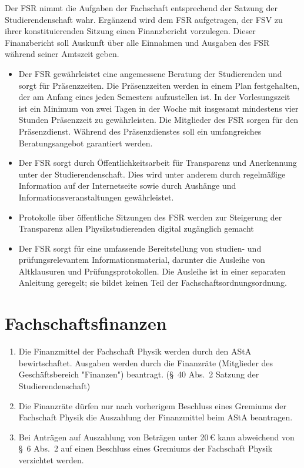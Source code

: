 \documentclass[
	a4paper,
	12pt,
	oneside,
	parskip=half-,
	pagesize,
	headsepline,
	german,
	ngerman
]{scrartcl}
\begin{document}
Der FSR nimmt die Aufgaben der Fachschaft entsprechend der Satzung der Studierendenschaft wahr. Ergänzend wird dem FSR aufgetragen, der FSV zu ihrer konstituierenden Sitzung einen Finanzbericht vorzulegen. Dieser Finanzbericht soll Auskunft über alle Einnahmen und Ausgaben des FSR während seiner Amtszeit geben.

\begin{itemize}
	\item Der FSR gewährleistet eine angemessene Beratung der Studierenden und sorgt für Präsenzzeiten. Die Präsenzzeiten werden in einem Plan festgehalten, der am Anfang eines jeden Semesters aufzustellen ist. In der Vorlesungszeit ist ein Minimum von zwei Tagen in der Woche mit insgesamt mindestens vier Stunden Präsenzzeit zu gewährleisten. Die Mitglieder des FSR sorgen für den Präsenzdienst. Während des Präsenzdienstes soll ein umfangreiches Beratungsangebot garantiert werden.
	\item Der FSR sorgt durch Öffentlichkeitsarbeit für Transparenz und Anerkennung unter der Studierendenschaft. Dies wird unter anderem durch regelmäßige Information auf der Internetseite sowie durch Aushänge und Informationsveranstaltungen gewährleistet.
	\item Protokolle über öffentliche Sitzungen des FSR werden zur Steigerung der Transparenz allen Physikstudierenden digital zugänglich gemacht
	\item Der FSR sorgt für eine umfassende Bereitstellung von studien- und prüfungsrelevantem Informationsmaterial, darunter die Ausleihe von Altklausuren und Prüfungsprotokollen. Die Ausleihe ist in einer separaten Anleitung geregelt; sie bildet keinen Teil der Fachschaftsordnungsordnung.
\end{itemize}


\section{Fachschaftsfinanzen}
\label{sec:Finanzen}

\begin{enumerate}
	\item Die Finanzmittel der Fachschaft Physik werden durch den AStA bewirtschaftet. Ausgaben werden durch die Finanzräte (Mitglieder des Geschäftsbereich "Finanzen") beantragt. (§~40 Abs.~2 Satzung der Studierendenschaft)
	\item Die Finanzräte dürfen nur nach vorherigem Beschluss eines Gremiums der Fachschaft Physik die Auszahlung der Finanzmittel beim AStA beantragen.
	\label{Finanzen_2}
	\item Bei Anträgen auf Auszahlung von Beträgen unter 20\,€ kann abweichend von §~6 Abs.~2 auf einen Beschluss eines Gremiums der Fachschaft Physik verzichtet werden.
\end{enumerate}
\end{document}
